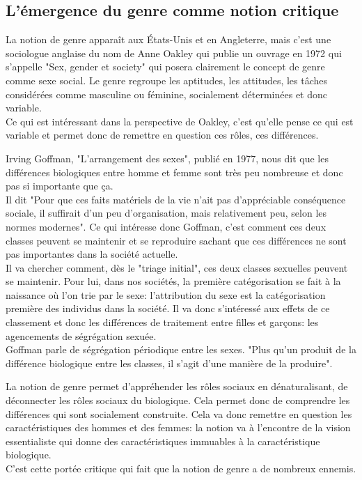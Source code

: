 \documentclass[12pt, a4paper, openany]{book}
\begin{document}
\subsection{L'émergence du genre comme notion critique}

La notion de genre apparaît aux États-Unis et en Angleterre, mais c'est une sociologue anglaise du nom de Anne Oakley qui publie un ouvrage en 1972 qui s'appelle "Sex, gender et society" qui posera clairement le concept de genre comme sexe social. Le genre regroupe les aptitudes, les attitudes, les tâches considérées comme masculine ou féminine, socialement déterminées et donc variable. \\
Ce qui est intéressant dans la perspective de Oakley, c'est qu'elle pense ce qui est variable et permet donc de remettre en question ces rôles, ces différences. 


Irving Goffman, "L'arrangement des sexes", publié en 1977, nous dit que les différences biologiques entre homme et femme sont très peu nombreuse et donc pas si importante que ça. \\ 
Il dit "Pour que ces faits matériels de la vie n'ait pas d'appréciable conséquence sociale, il suffirait d'un peu d'organisation, mais relativement peu, selon les normes modernes". Ce qui intéresse donc Goffman, c'est comment ces deux classes peuvent se maintenir et se reproduire sachant que ces différences ne sont pas importantes dans la société actuelle. \\
Il va chercher comment, dès le "triage initial", ces deux classes sexuelles peuvent se maintenir. Pour lui, dans nos sociétés, la première catégorisation se fait à la naissance où l'on trie par le sexe: l'attribution du sexe est la catégorisation première des individus dans la société. Il va donc s'intéressé aux effets de ce classement et donc les différences de traitement entre filles et garçons: les agencements de ségrégation sexuée. \\ 
Goffman parle de ségrégation périodique entre les sexes. "Plus qu'un produit de la différence biologique entre les classes, il s'agit d'une manière de la produire". 


La notion de genre permet d'appréhender les rôles sociaux en dénaturalisant, de déconnecter les rôles sociaux du biologique. Cela permet donc de comprendre les différences qui sont socialement construite. Cela va donc remettre en question les caractéristiques des hommes et des femmes: la notion va à l'encontre de la vision essentialiste qui donne des caractéristiques immuables à la caractéristique biologique. \\
C'est cette portée critique qui fait que la notion de genre a de nombreux ennemis. 
\end{document}
